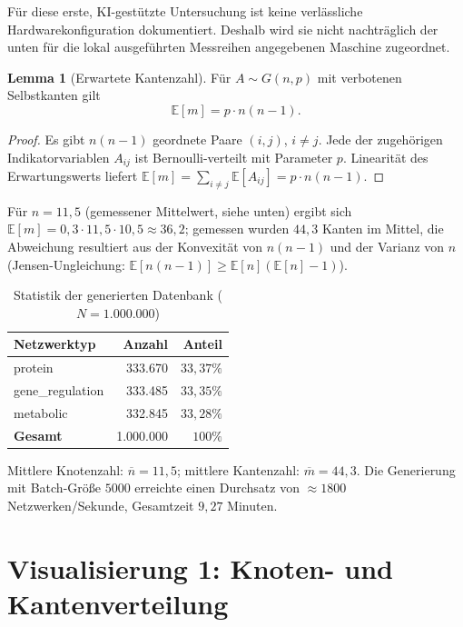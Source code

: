 \documentclass[a4paper,12pt, twoside]{report}
\theoremstyle{definition}
\newtheorem{lemma}{Lemma}
\begin{document}
Für diese erste, KI-gestützte Untersuchung ist keine verlässliche Hardwarekonfiguration dokumentiert. Deshalb wird sie nicht nachträglich der unten für die lokal ausgeführten Messreihen angegebenen Maschine zugeordnet.

\begin{lemma}[Erwartete Kantenzahl]
	Für $A \sim G(n,p)$ mit verbotenen Selbstkanten gilt
	\[
	\mathbb{E}[m] = p \cdot n(n-1).
	\]
\end{lemma}

\begin{proof}
	Es gibt $n(n-1)$ geordnete Paare $(i,j)$, $i \ne j$. Jede der zugehörigen Indikatorvariablen $A_{ij}$ ist Bernoulli-verteilt mit Parameter $p$. Linearität des Erwartungswerts liefert $\mathbb{E}[m] = \sum_{i\ne j} \mathbb{E}[A_{ij}] = p\cdot n(n-1)$.
\end{proof}

Für $n=11{,}5$ (gemessener Mittelwert, siehe unten) ergibt sich $\mathbb{E}[m] = 0{,}3 \cdot 11{,}5 \cdot 10{,}5 \approx 36{,}2$; gemessen wurden $44{,}3$ Kanten im Mittel, die Abweichung resultiert aus der Konvexität von $n(n-1)$ und der Varianz von $n$ (Jensen-Ungleichung: $\mathbb{E}[n(n-1)] \ge \mathbb{E}[n](\mathbb{E}[n]-1)$).

\begin{table}[h]
	\centering
	\caption{Statistik der generierten Datenbank ($N=1.000.000$)}
	\begin{tabular}{lrr}
		\toprule
		Netzwerktyp & Anzahl & Anteil \\
		\midrule
		protein & 333.670 & $33{,}37\%$ \\
		gene\_regulation & 333.485 & $33{,}35\%$ \\
		metabolic & 332.845 & $33{,}28\%$ \\
		\midrule
		\textbf{Gesamt} & 1.000.000 & $100\%$ \\
		\bottomrule
	\end{tabular}
	\label{tab:stats}
\end{table}

Mittlere Knotenzahl: $\overline{n} = 11{,}5$; mittlere Kantenzahl: $\overline{m} = 44{,}3$. Die Generierung mit Batch-Größe $5000$ erreichte einen Durchsatz von $\approx 1800$ Netzwerken/Sekunde, Gesamtzeit $9{,}27$ Minuten.

\section{Visualisierung 1: Knoten- und Kantenverteilung}
\end{document}
